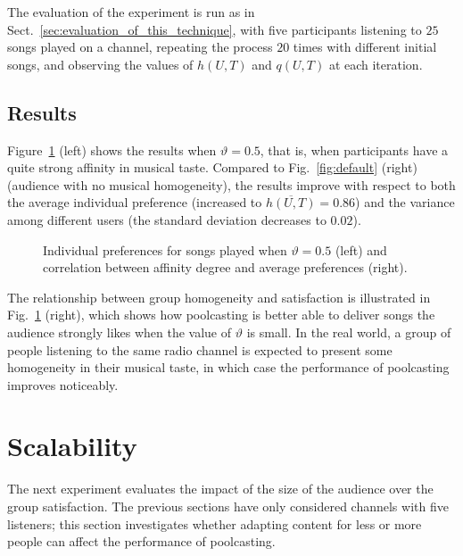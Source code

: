 The evaluation of the experiment is run as in Sect.~\ref{sec:evaluation_of_this_technique}, with five participants listening to $25$ songs played on a channel, repeating the process $20$ times with different initial songs, and observing the values of $h(U,T)$ and $q(U,T)$ at each iteration.

\subsection{Results} %
\label{sub:results44}

Figure~\ref{fig:bump2} (left) shows the results when $\vartheta = 0.5$, that is, when participants have a quite strong affinity in musical taste. 
Compared to Fig.~\ref{fig:default} (right) (audience with no musical homogeneity), the results improve with respect to both the average individual preference (increased to $\overline{h(U,T)} = 0.86$) and the variance among different users (the standard deviation decreases to $0.02$).
%
\begin{figure}[bthp]
\centering \setlength{\abovecaptionskip}{3pt}
\caption{Individual preferences for songs played when $\vartheta = 0.5$ (left) and correlation between affinity degree and average preferences (right).}
\label{fig:bump2}
\end{figure}

The relationship between group homogeneity and satisfaction is illustrated in Fig.~\ref{fig:bump2} (right), which shows how poolcasting is better able to deliver songs the audience strongly likes when the value of $\vartheta$ is small.
In the real world, a group of people listening to the same radio channel is expected to present some homogeneity in their musical taste, in which case the performance of poolcasting improves noticeably.



\section{Scalability} %
\label{sub:scalability}

The next experiment evaluates the impact of the size of the audience over the group satisfaction.
The previous sections have only considered channels with five listeners; this section investigates whether adapting content for less or more people can affect the performance of poolcasting.


